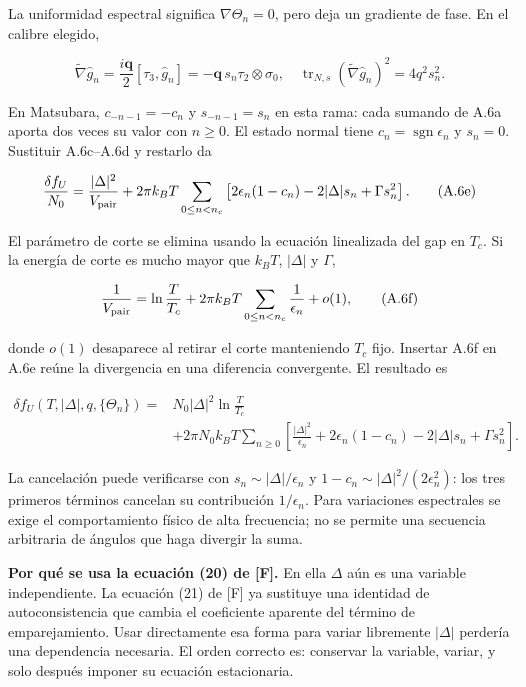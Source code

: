 \documentclass[
  spanish,
  10pt,
  a4paper,
]{article}
\begin{document}
La uniformidad espectral significa \(\nabla\Theta_n=0\), pero deja un
gradiente de fase. En el calibre elegido,

\[
\widetilde\nabla\hat g_n
=\frac{i\mathbf q}{2}[\tau_3,\hat g_n]
=-\mathbf q\,s_n\tau_2\otimes\sigma_0,
\quad
\operatorname{tr}_{N,s}(\widetilde\nabla\hat g_n)^2
=4q^2s_n^2.
\tag{A.6d}
\]

En Matsubara, \(c_{-n-1}=-c_n\) y \(s_{-n-1}=s_n\) en esta rama: cada
sumando de A.6a aporta dos veces su valor con \(n\geq0\). El estado
normal tiene \(c_n=\operatorname{sgn}\epsilon_n\) y \(s_n=0\). Sustituir
A.6c--A.6d y restarlo da

\[
\frac{\delta f_U}{N_0}
=\frac{|\Delta|^2}{V_{\rm pair}}
+2\pi k_BT\sum_{0\leq n<n_c}
\left[2\epsilon_n(1-c_n)-2|\Delta|s_n+\Gamma s_n^2\right].
\tag{A.6e}
\]

El parámetro de corte se elimina usando la ecuación linealizada del gap
en \(T_c\). Si la energía de corte es mucho mayor que \(k_BT\),
\(|\Delta|\) y \(\Gamma\),

\[
\frac{1}{V_{\rm pair}}
=\ln\frac{T}{T_c}
+2\pi k_BT\sum_{0\leq n<n_c}\frac{1}{\epsilon_n}
+o(1),
\tag{A.6f}
\]

donde \(o(1)\) desaparece al retirar el corte manteniendo \(T_c\) fijo.
Insertar A.6f en A.6e reúne la divergencia en una diferencia
convergente. El resultado es

\[
\begin{aligned}
\delta f_U(T,|\Delta|,q,\{\Theta_n\})
={}&N_0|\Delta|^2\ln\frac{T}{T_c}\\
&+2\pi N_0k_BT\sum_{n\geq0}
\left[\frac{|\Delta|^2}{\epsilon_n}
+2\epsilon_n(1-c_n)-2|\Delta|s_n+\Gamma s_n^2\right].
\end{aligned}
\tag{A.6}
\]

La cancelación puede verificarse con \(s_n\sim|\Delta|/\epsilon_n\) y
\(1-c_n\sim|\Delta|^2/(2\epsilon_n^2)\): los tres primeros términos
cancelan su contribución \(1/\epsilon_n\). Para variaciones espectrales
se exige el comportamiento físico de alta frecuencia; no se permite una
secuencia arbitraria de ángulos que haga divergir la suma.

\textbf{Por qué se usa la ecuación (20) de {[}F{]}.} En ella \(\Delta\)
aún es una variable independiente. La ecuación (21) de {[}F{]} ya
sustituye una identidad de autoconsistencia que cambia el coeficiente
aparente del término de emparejamiento. Usar directamente esa forma para
variar libremente \(|\Delta|\) perdería una dependencia necesaria. El
orden correcto es: conservar la variable, variar, y solo después imponer
su ecuación estacionaria.
\end{document}
